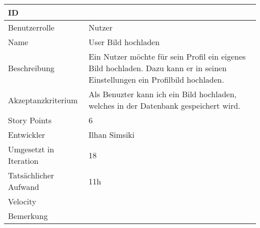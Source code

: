 \begin{tabularx}{\textwidth}{|p{}|X|}
	\hline
	ID & \\
	\hline
	Benutzerrolle & Nutzer\\
	\hline
	Name & User Bild hochladen\\
	\hline
	Beschreibung & Ein Nutzer möchte für sein Profil ein eigenes Bild hochladen. Dazu kann er in seinen Einstellungen ein Profilbild hochladen.\\
	\hline
	Akzeptanzkriterium & Als Benuzter kann ich ein Bild hochladen, welches in der Datenbank gespeichert wird.\\
	\hline
	Story Points & 6\\
	\hline
	Entwickler & Ilhan Simsiki\\
	\hline
	Umgesetzt in Iteration & 18\\
	\hline
	Tatsächlicher Aufwand & 11h\\
	\hline
	Velocity & \\
	\hline
	Bemerkung & \\
	\hline
\end{tabularx}
\vspace{20pt}
